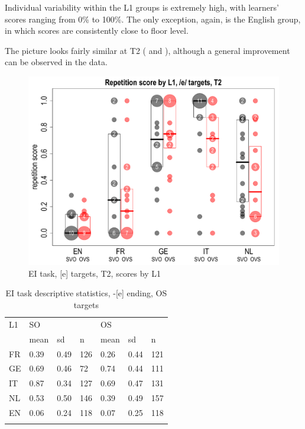 Individual variability within the L1 groups is extremely high, with learners’ scores ranging from 0\% to 100\%. The only exception, again, is the English group, in which scores are consistently close to floor level.

The picture looks fairly similar at T2 ( and ), although a general improvement can be observed in the data.

\begin{figure}
    \includegraphics[width=\textwidth]{figures/04-2.pdf}
    \caption{EI task, [e] targets, T2, scores by L1}
    \label{fig:04:2}
\end{figure}

\begin{table}
    \begin{tabularx}{\textwidth}{XXXXXXX}
    \lsptoprule
    L1 & \multicolumn{3}{X}{ SO} & \multicolumn{3}{X}{ OS}\\
    & mean & sd & n & mean & sd & n\\
    \cmidrule{2-7}
    FR & 0.39 & 0.49 & 126 & 0.26 & 0.44 & 121\\
    GE & 0.69 & 0.46 & 72 & 0.74 & 0.44 & 111\\
    IT & 0.87 & 0.34 & 127 & 0.69 & 0.47 & 131\\
    NL & 0.53 & 0.50 & 146 & 0.39 & 0.49 & 157\\
    EN & 0.06 & 0.24 & 118 & 0.07 & 0.25 & 118\\
    \lspbottomrule
    \end{tabularx}
    \caption{EI task descriptive statistics, -[e] ending, OS targets}
    \label{tab:04:2}
\end{table}

